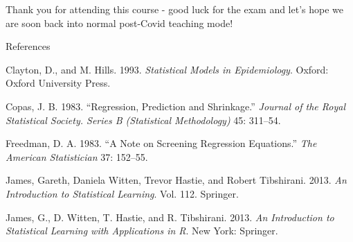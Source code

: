 \documentclass[10pt,ignorenonframetext,]{beamer}
\begin{document}
\begin{frame}

Thank you for attending this course - good luck for the exam and let's
hope we are soon back into normal post-Covid teaching mode!

\end{frame}

\begin{frame}{References}
\protect\hypertarget{references}{}

\hypertarget{refs}{}
\leavevmode\hypertarget{ref-clayton.hills1993}{}%
Clayton, D., and M. Hills. 1993. \emph{Statistical Models in
Epidemiology}. Oxford: Oxford University Press.

\leavevmode\hypertarget{ref-copas1983}{}%
Copas, J. B. 1983. ``Regression, Prediction and Shrinkage.''
\emph{Journal of the Royal Statistical Society. Series B (Statistical
Methodology)} 45: 311--54.

\leavevmode\hypertarget{ref-freedman1983}{}%
Freedman, D. A. 1983. ``A Note on Screening Regression Equations.''
\emph{The American Statistician} 37: 152--55.

\leavevmode\hypertarget{ref-ISL}{}%
James, Gareth, Daniela Witten, Trevor Hastie, and Robert Tibshirani.
2013. \emph{An Introduction to Statistical Learning}. Vol. 112.
Springer.

\leavevmode\hypertarget{ref-james.etal}{}%
James, G., D. Witten, T. Hastie, and R. Tibshirani. 2013. \emph{An
Introduction to Statistical Learning with Applications in R}. New York:
Springer.

\end{frame}
\end{document}
